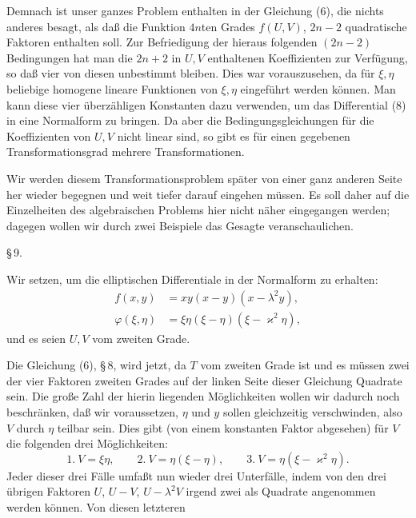Demnach ist unser ganzes Problem enthalten in der Gleichung (6), die
nichts anderes besagt, als daß die Funktion $4n$ten Grades $f(U,V)$,
$2n-2$ quadratische Faktoren enthalten soll. Zur Befriedigung der
hieraus folgenden $(2n-2)$ Bedingungen hat man die $2n+2$ in $U,V$
enthaltenen Koeffizienten zur Verfügung, so daß vier von diesen
unbestimmt bleiben. Dies war vorauszusehen, da für $\xi,\eta$ beliebige
homogene lineare Funktionen von $\xi,\eta$ eingeführt werden können. Man
kann diese vier überzähligen Konstanten dazu verwenden, um das
Differential (8) in eine Normalform zu bringen. Da aber die
Bedingungsgleichungen für die Koeffizienten von $U,V$ nicht linear sind,
so gibt es für einen gegebenen Transformationsgrad mehrere
Transformationen.

Wir werden diesem Transformationsproblem später von einer ganz anderen
Seite her wieder begegnen und weit tiefer darauf eingehen müssen. Es
soll daher auf die Einzelheiten des algebraischen Problems hier nicht
näher eingegangen werden; dagegen wollen wir durch zwei Beispiele das
Gesagte veranschaulichen.

\begin{center}
\S\,9. \textbf{}
\end{center}

Wir setzen, um die elliptischen Differentiale in der Normalform zu
erhalten:
\[
\begin{aligned}
f(x,y) &= xy(x-y)(x-\lambda^2 y),\\
\varphi(\xi,\eta) &= \xi\eta(\xi-\eta)(\xi-\varkappa^2\eta),
\end{aligned}
\]
und es seien $U, V$ vom zweiten Grade.

Die Gleichung (6), \S\,8, wird jetzt, da $T$ vom zweiten Grade ist
und es müssen zwei der vier Faktoren zweiten Grades auf der linken Seite
dieser Gleichung Quadrate sein. Die große Zahl der hierin liegenden
Möglichkeiten wollen wir dadurch noch beschränken, daß wir voraussetzen,
$\eta$ und $y$ sollen gleichzeitig verschwinden, also $V$ durch $\eta$
teilbar sein. Dies gibt (von einem konstanten Faktor abgesehen) für $V$
die folgenden drei Möglichkeiten:
\[
1.\ V = \xi\eta, \qquad 2.\ V = \eta(\xi-\eta), \qquad 3.\ V = \eta(\xi-\varkappa^2\eta).
\]
Jeder dieser drei Fälle umfaßt nun wieder drei Unterfälle, indem von den
drei übrigen Faktoren $U$, $U-V$, $U-\lambda^2 V$ irgend zwei als
Quadrate angenommen werden können. Von diesen letzteren
